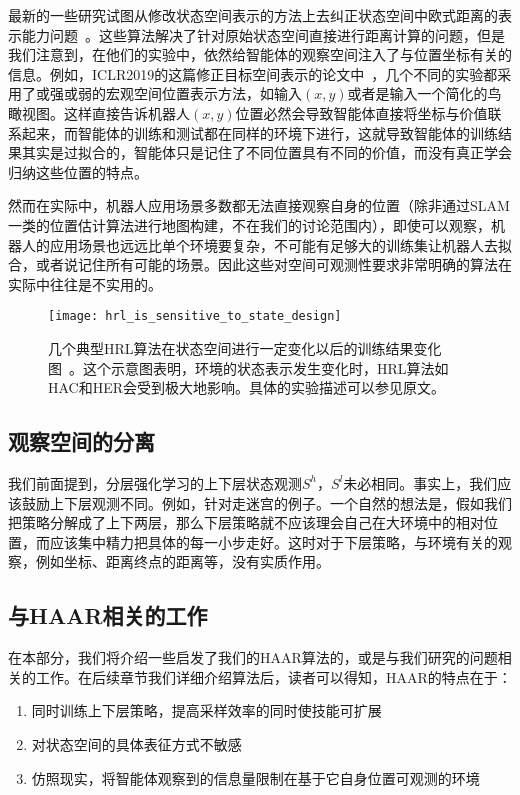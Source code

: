 最新的一些研究试图从修改状态空间表示的方法上去纠正状态空间中欧式距离的表示能力问题~\cite{goal-conditioned, goal_repr_learning}。这些算法解决了针对原始状态空间直接进行距离计算的问题，但是我们注意到，在他们的实验中，依然给智能体的观察空间注入了与位置坐标有关的信息。例如，ICLR2019的这篇修正目标空间表示的论文中~\cite{goal_repr_learning}，几个不同的实验都采用了或强或弱的宏观空间位置表示方法，如输入$(x, y)$或者是输入一个简化的鸟瞰视图。这样直接告诉机器人$(x, y)$位置必然会导致智能体直接将坐标与价值联系起来，而智能体的训练和测试都在同样的环境下进行，这就导致智能体的训练结果其实是过拟合的，智能体只是记住了不同位置具有不同的价值，而没有真正学会归纳这些位置的特点。

然而在实际中，机器人应用场景多数都无法直接观察自身的位置（除非通过SLAM一类的位置估计算法进行地图构建，不在我们的讨论范围内），即使可以观察，机器人的应用场景也远远比单个环境要复杂，不可能有足够大的训练集让机器人去拟合，或者说记住所有可能的场景。因此这些对空间可观测性要求非常明确的算法在实际中往往是不实用的。

\begin{figure}[h] %
  \centering
  \texttt{[image: hrl\_is\_sensitive\_to\_state\_design]}
  \caption{几个典型HRL算法在状态空间进行一定变化以后的训练结果变化图~\cite{sensitive_to_goal_space}。这个示意图表明，环境的状态表示发生变化时，HRL算法如HAC和HER会受到极大地影响。具体的实验描述可以参见原文。}
  \label{fig:sensitive_to_goal}
\end{figure}

\subsection{观察空间的分离}
我们前面提到，分层强化学习的上下层状态观测$S^h$，$S^l$未必相同。事实上，我们应该鼓励上下层观测不同。例如，针对走迷宫的例子。一个自然的想法是，假如我们把策略分解成了上下两层，那么下层策略就不应该理会自己在大环境中的相对位置，而应该集中精力把具体的每一小步走好。这时对于下层策略，与环境有关的观察，例如坐标、距离终点的距离等，没有实质作用。

\subsection{与HAAR相关的工作}
在本部分，我们将介绍一些启发了我们的HAAR算法的，或是与我们研究的问题相关的工作。在后续章节我们详细介绍算法后，读者可以得知，HAAR的特点在于：
\begin{enumerate}
  \item 同时训练上下层策略，提高采样效率的同时使技能可扩展
  \item 对状态空间的具体表征方式不敏感
  \item 仿照现实，将智能体观察到的信息量限制在基于它自身位置可观测的环境
\end{enumerate}

